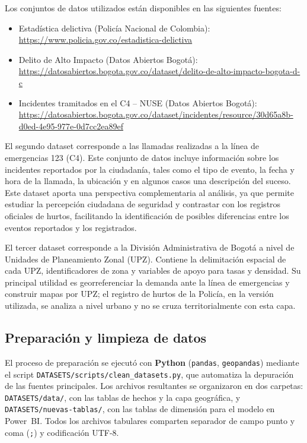 \documentclass[12pt,letterpaper]{article}
\begin{document}
Los conjuntos de datos utilizados están disponibles en las siguientes fuentes:
\begin{itemize}[noitemsep, topsep=0pt]
    \item Estadística delictiva (Policía Nacional de Colombia): \url{https://www.policia.gov.co/estadistica-delictiva}
    \item Delito de Alto Impacto (Datos Abiertos Bogotá): \url{https://datosabiertos.bogota.gov.co/dataset/delito-de-alto-impacto-bogota-d-c}
    \item Incidentes tramitados en el C4 -- NUSE (Datos Abiertos Bogotá): \url{https://datosabiertos.bogota.gov.co/dataset/incidentes/resource/30d65a8b-d0ed-4e95-977e-0d7cc2ea89ef}
\end{itemize}

El segundo dataset corresponde a las llamadas realizadas a la línea de emergencias 123 (C4). Este conjunto de datos incluye información sobre los incidentes reportados por la ciudadanía, tales como el tipo de evento, la fecha y hora de la llamada, la ubicación y en algunos casos una descripción del suceso. Este dataset aporta una perspectiva complementaria al análisis, ya que permite estudiar la percepción ciudadana de seguridad y contrastar con los registros oficiales de hurtos, facilitando la identificación de posibles diferencias entre los eventos reportados y los registrados.

El tercer dataset corresponde a la División Administrativa de Bogotá a nivel de Unidades de Planeamiento Zonal (UPZ). Contiene la delimitación espacial de cada UPZ, identificadores de zona y variables de apoyo para tasas y densidad. Su principal utilidad es georreferenciar la demanda ante la línea de emergencias y construir mapas por UPZ; el registro de hurtos de la Policía, en la versión utilizada, se analiza a nivel urbano y no se cruza territorialmente con esta capa.

\subsection{Preparación y limpieza de datos}

El proceso de preparación se ejecutó con \textbf{Python} (\texttt{pandas}, \texttt{geopandas}) mediante el script \texttt{DATASETS/scripts/clean\_datasets.py}, que automatiza la depuración de las fuentes principales. Los archivos resultantes se organizaron en dos carpetas: \texttt{DATASETS/data/}, con las tablas de hechos y la capa geográfica, y \texttt{DATASETS/nuevas-tablas/}, con las tablas de dimensión para el modelo en Power~BI. Todos los archivos tabulares comparten separador de campo punto y coma (\texttt{;}) y codificación UTF-8.
\end{document}
